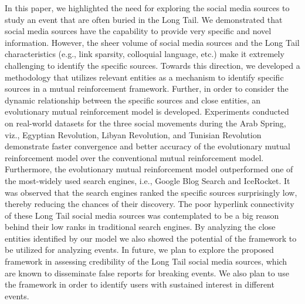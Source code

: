 In this paper, we highlighted the need for exploring the social media sources to study an event that are often buried in the Long Tail. We demonstrated that social media sources have the capability to provide very specific and novel information. However, the sheer volume of social media sources and the Long Tail characteristics (e.g., link sparsity, colloquial language, etc.) make it extremely challenging to identify the specific sources. Towards this direction, we developed a methodology that utilizes relevant entities as a mechanism to identify specific sources in a mutual reinforcement framework. Further, in order to consider the dynamic relationship between the specific sources and close entities, an evolutionary mutual reinforcement model is developed. Experiments conducted on real-world datasets for the three social movements during the Arab Spring, viz., Egyptian Revolution, Libyan Revolution, and Tunisian Revolution demonstrate faster convergence and better accuracy of the evolutionary mutual reinforcement model over the conventional mutual reinforcement model. Furthermore, the evolutionary mutual reinforcement model outperformed one of the most-widely used search
engines, i.e., Google Blog Search and IceRocket. It was observed that the search engines ranked the specific sources surprisingly low, thereby reducing the chances of their discovery. The poor hyperlink connectivity of these Long Tail social media sources was contemplated to be a big reason behind their low ranks in traditional search engines. By analyzing the close entities identified by our model we also showed the potential of the framework to be utilized for analyzing events. In future, we plan to explore the proposed framework in assessing credibility of the Long Tail social media sources, which are known to disseminate false reports for breaking events. We also plan to use the framework in order to identify users with sustained interest in different events.
